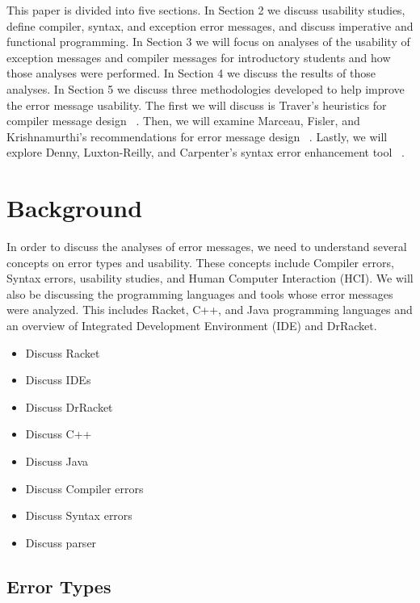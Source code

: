 \documentclass{sig-alternate}
\begin{document}
This paper is divided into five sections. In Section 2 we discuss usability studies, define compiler, syntax, and exception error messages, and discuss imperative and functional programming. In Section 3 we will focus on  analyses of the usability of exception messages and compiler messages for introductory students and how those analyses were performed. In Section 4 we discuss the results of those analyses. In Section 5 we discuss three methodologies developed to help improve the error message usability. The first we will discuss is Traver's heuristics for compiler message design ~\cite{Traver:2010}. Then, we will examine Marceau, Fisler, and Krishnamurthi's recommendations for error message design ~\cite{Marceau:2011:MYL:2048237.2048241}. Lastly, we will explore Denny, Luxton-Reilly, and Carpenter's syntax error enhancement tool ~\cite{Denny:2014:ESE:2591708.2591748}.



\section{Background}\label{background}
In order to discuss the analyses of error messages, we need to understand several concepts on error types and usability. These concepts include Compiler errors, Syntax errors, usability studies, and Human Computer Interaction (HCI). We will also be discussing the programming languages and tools whose error messages were analyzed. This includes Racket, C++, and Java programming languages and an overview of Integrated Development Environment (IDE) and DrRacket. 


\begin{itemize}
	\item Discuss Racket
	\item Discuss IDEs
	\item Discuss DrRacket
	\item Discuss C++
	\item Discuss Java
	\item Discuss Compiler errors
	\item Discuss Syntax errors
	\item Discuss parser
\end{itemize}

\subsection{Error Types}
\end{document}
